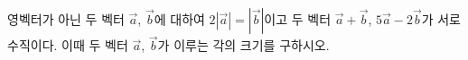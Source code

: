 영벡터가 아닌 두 벡터 $\vec{a}$, $\vec{b}$에 대하여 $2|\vec{a}|=|\vec{b}|$이고 두 벡터 $\vec{a}+\vec{b}$, $5\vec{a}-2\vec{b}$가 서로 수직이다. 이때 두 벡터 $\vec{a}$, $\vec{b}$가 이루는 각의 크기를 구하시오.
